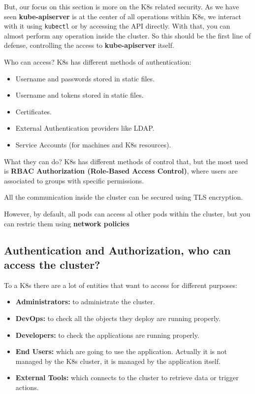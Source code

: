 \documentclass{article}
\begin{document}
But, our focus on this section is more on the K8s related security. As we have seen \textbf{kube-apiserver} is at the center
of all operations within K8s, we interact with it using \verb|kubectl| or by accessing the API directly. With that, you can almost perform any operation inside the cluster. So this should be the first line of defense, controlling the access to \textbf{kube-apiserver} itself.

Who can access? K8s has different methods of authentication:
\begin{itemize}
    \item Username and passwords stored in static files.
    \item Username and tokens stored in static files.
    \item Certificates.
    \item External Authentication providers like LDAP.
    \item Service Accounts (for machines and K8s resources).
\end{itemize}

What they can do? K8s has different methods of control that, but the most used is \textbf{RBAC Authorization (Role-Based Access Control)}, where users are associated to groups with specific permissions.

All the communication inside the cluster can be secured using TLS encryption.

However, by default, all pods can access al other pods within the cluster, but you can restric them using \textbf{network policies}

\subsection{Authentication and Authorization, who can access the cluster?}

To a K8s there are a lot of entities that want to access for different purposes:
\begin{itemize}
    \item \textbf{Administrators:} to administrate the cluster.
    \item \textbf{DevOps:} to check all the objects they deploy are running properly.
    \item \textbf{Developers:} to check the applications are running properly.
    \item \textbf{End Users:} which are going to use the application. Actually it is not managed by the K8s cluster, it is managed by the application itself.
    \item \textbf{External Tools:} which connects to the cluster to retrieve data or trigger actions.
\end{itemize}
\end{document}
